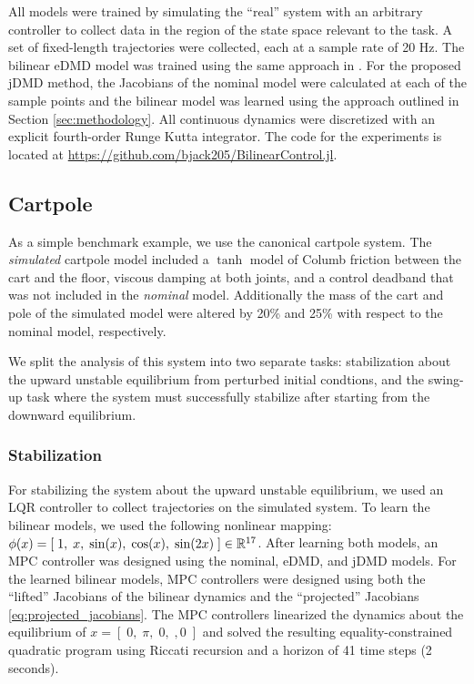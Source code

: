 \documentclass{article}
\begin{document}
All models were trained by simulating the ``real'' system with an arbitrary controller to 
collect data in the region of the state space relevant to the task. A set of fixed-length 
trajectories were collected, each at a sample rate of 20 Hz. The bilinear eDMD model was
trained using the same approach in \cite{Folkestad2021}. For the proposed jDMD method, the
Jacobians of the nominal model were calculated at each of the sample points and the bilinear
model was learned using the approach outlined in Section \ref{sec:methodology}.
All continuous dynamics were discretized with an explicit fourth-order Runge Kutta 
integrator. The code for the experiments is located at 
\url{https://github.com/bjack205/BilinearControl.jl}.


\subsection{Cartpole}
As a simple benchmark example, we use the canonical cartpole system. The \textit{simulated}
cartpole model included a $\tanh$ model of Columb friction between the cart and the 
floor, viscous damping at both joints, and a control deadband that was not included in the 
\textit{nominal} model. Additionally the mass of the cart and pole of the simulated model 
were altered by 20\% and 25\% with respect to the nominal model, respectively. 

We split the analysis of this system into two separate tasks: stabilization about the upward
unstable equilibrium from perturbed initial condtions, and the swing-up task where the 
system must successfully stabilize after starting from the downward equilibrium.

\subsubsection{Stabilization}

For stabilizing the system about the upward unstable equilibrium, we used an LQR controller
to collect trajectories on the simulated system. To learn
the bilinear models, we used the following nonlinear mapping: $\phi(x) = [\; 1,\; x,\;
\sin(x),\; \cos(x),\; \sin(2x)\; ] \in \mathbb{R}^{17}$.  After learning both models, an MPC
controller was designed using the nominal, eDMD, and jDMD models. For the learned bilinear
models, MPC controllers were designed using both the ``lifted'' Jacobians of the bilinear 
dynamics and the ``projected'' Jacobians \eqref{eq:projected_jacobians}. The MPC controllers
linearized the dynamics about the equilibrium of $x = [\;0,\; \pi,\; 0,\;, 0\;]$ and solved
the resulting equality-constrained quadratic program using Riccati recursion and a horizon
of 41 time steps (2 seconds). 
\end{document}
